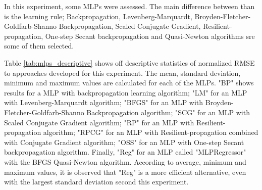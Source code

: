 In this experiment, some MLPs were assessed. The main difference between than is the learning rule; Backpropagation, Levenberg-Marquardt, Broyden-Fletcher-Goldfarb-Shanno Backpropagation, Scaled Conjugate Gradient, Resilient-propagation, One-step Secant backpropagation and Quasi-Newton algorithms sre some of them selected.

Table \ref{tab:mlps_descriptive} shows off descriptive statistics of normalized RMSE to approaches developed for this experiment. The mean, standard deviation, minimum and maximum values are calculated for each of the MLPs. "BP" shows results for a MLP with backpropagation learning algorithm; "LM" for an MLP with Levenberg-Marquardt algorithm; "BFGS" for an MLP with Broyden-Fletcher-Goldfarb-Shanno Backpropagation algorithm; "SCG" for an MLP with Scaled Conjugate Gradient algorithm; "RP" for an MLP with Resilient-propagation algorithm; "RPCG" for an MLP with Resilient-propagation combined with Conjugate Gradient algorithm; "OSS" for an MLP with One-step Secant backpropagation algorithm. Finally, "Reg" for an MLP called "MLPRegressor" with the BFGS Quasi-Newton algorithm. According to average, minimum and maximum values, it is observed that "Reg" is a more efficient alternative, even with the largest standard deviation second this experiment.

